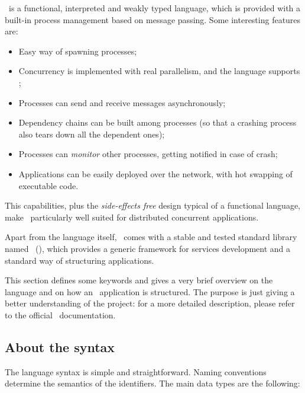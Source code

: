 \Erlang\ is a functional, interpreted and weakly typed language, which
is provided with a built-in process management  based on
message passing. Some interesting features are:
\begin{itemize}
\item   Easy way of spawning processes;
\item   Concurrency is implemented with real parallelism, and the
        language supports ;
\item   Processes can send and receive messages asynchronously;
\item   Dependency chains can be built among processes (so that a
        crashing process also tears down all the dependent ones);
\item   Processes can \emph{monitor} other processes, getting notified
        in case of crash;
\item   Applications can be easily deployed over the network, with hot
        swapping of executable code.
\end{itemize}

This capabilities, plus the \emph{side-effects free} design typical
of a functional language, make \Erlang\ particularly well suited for
distributed concurrent applications.

Apart from the language itself, \Erlang\ comes with a stable and tested
standard library named \OTP\ (\OTPa), which provides a generic framework
for services development and a standard way of structuring applications.

This section defines some keywords and gives a very brief overview on the
language and on how an \Erlang\ application is structured. The purpose is
just giving a better understanding of the project: for a more detailed
description, please refer to the official \Erlang\
documentation\cite{bib:ErlApp}.


\subsection{About the syntax}

The language syntax is simple and straightforward. Naming
conventions determine the semantics of the identifiers. The main data
types are the following:

